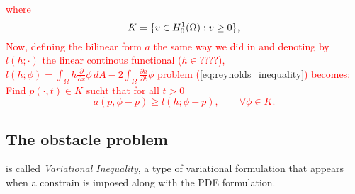 \textcolor{red}{where
\begin{equation}
K=\{v\in\hzerooneOm:v\geq 0\},\label{eq:definition_K}
\end{equation}
}
\textcolor{red}{Now, defining the bilinear form $a$ the same way we did in  and denoting by $l(h;\cdot)$ the linear continous functional ($h\in ????$), $l(h;\phi)= \int_\Omega h\frac{\partial }{\partial x}\phi\,dA-2\int_\Omega\frac{\partial h}{\partial t}\phi$ problem (\ref{eq:reynolds_inequality}) becomes: Find $p(\cdot,t) \in K$ sucht that for all $t >0$
\begin{equation}
a(p,\phi-p)\geq l(h;\phi-p),\qquad\forall \phi \in K.\label{eq:reynolds_model_weak_formulation}
\end{equation}}

\subsection{The obstacle problem}
 is called \emph{Variational Inequality}, a type of variational formulation that appears when a constrain is imposed along with the PDE formulation.

